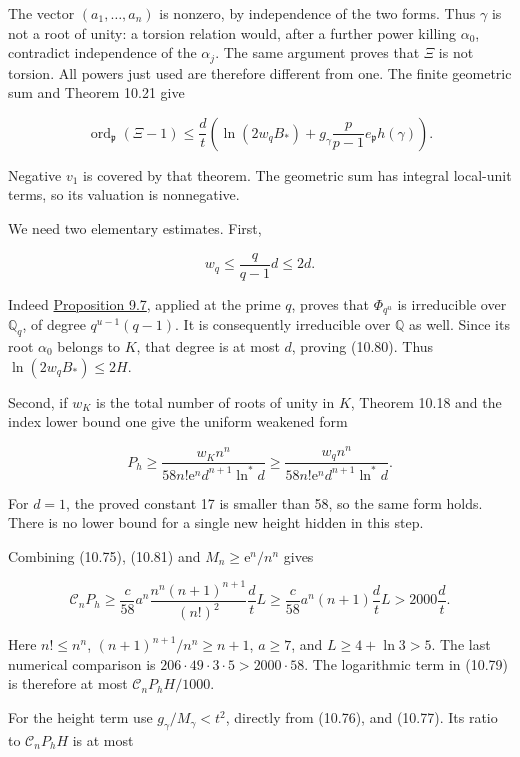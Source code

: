 \documentclass[
  11pt,
  a4paper,
]{article}
\begin{document}
The vector \((a_1,\ldots,a_n)\) is nonzero, by independence of the two
forms. Thus \(\gamma\) is not a root of unity: a torsion relation would,
after a further power killing \(\alpha_0\), contradict independence of
the \(\alpha_j\). The same argument proves that \(\Xi\) is not torsion.
All powers just used are therefore different from one. The finite
geometric sum and Theorem 10.21 give

\[
\operatorname{ord}_{\mathfrak p}(\Xi-1)
\le\frac d t\left(
\ln(2w_q B_*)+
g_\gamma\frac p{p-1}e_{\mathfrak p}h(\gamma)\right).
\tag{10.79}
\]

Negative \(v_1\) is covered by that theorem. The geometric sum has
integral local-unit terms, so its valuation is nonnegative.

We need two elementary estimates. First,

\[
w_q\le\frac q{q-1}d\le2d.
\tag{10.80}
\]

Indeed
\href{../TR-BAKER-09.html\#5-cyclotomic-ramification-and-distances-between-roots}{Proposition
9.7}, applied at the prime \(q\), proves that \(\Phi_{q^u}\) is
irreducible over \(\mathbb Q_q\), of degree \(q^{u-1}(q-1)\). It is
consequently irreducible over \(\mathbb Q\) as well. Since its root
\(\alpha_0\) belongs to \(K\), that degree is at most \(d\), proving
(10.80). Thus \(\ln(2w_qB_*)\le2H\).

Second, if \(w_K\) is the total number of roots of unity in \(K\),
Theorem 10.18 and the index lower bound one give the uniform weakened
form

\[
P_h\ge
\frac{w_K n^n}
{58 n!\mathrm e^n d^{n+1}\ln^*d}
\ge\frac{w_q n^n}
{58 n!\mathrm e^n d^{n+1}\ln^*d}.
\tag{10.81}
\]

For \(d=1\), the proved constant 17 is smaller than 58, so the same form
holds. There is no lower bound for a single new height hidden in this
step.

Combining (10.75), (10.81) and \(M_n\ge\mathrm e^n/n^n\) gives

\[
\mathcal C_nP_h\ge
\frac c{58}a^n
\frac{n^n(n+1)^{n+1}}{(n!)^2}\frac d tL
\ge\frac c{58}a^n(n+1)\frac d tL
>2000\frac d t.
\tag{10.82}
\]

Here \(n!\le n^n\), \((n+1)^{n+1}/n^n\ge n+1\), \(a\ge7\), and
\(L\ge4+\ln3>5\). The last numerical comparison is
\(206\cdot49\cdot3\cdot5>2000\cdot58\). The logarithmic term in (10.79)
is therefore at most \(\mathcal C_nP_hH/1000\).

For the height term use \(g_\gamma/M_\gamma<t^2\), directly from
(10.76), and (10.77). Its ratio to \(\mathcal C_nP_hH\) is at most
\end{document}
